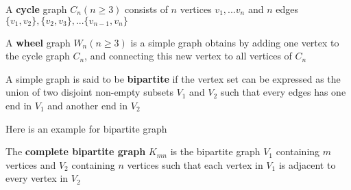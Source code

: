                 \begin{definition}
                    A \textbf{cycle} graph $C_n (n \ge 3)$ consists of $n$ vertices $v_1, ... v_n$ and $n$ edges $\{v_1, v_2\}, \{v_2, v_3\}, ... \{v_{n-1}, v_n\}$
                \end{definition}

                \begin{definition}
                    A \textbf{wheel} graph $W_n (n \ge 3)$ is a simple graph obtains by adding one vertex to the cycle graph $C_n$, and connecting this new vertex to all vertices of $C_n$ 
                \end{definition}

                \begin{definition}
                    A simple graph is said to be \textbf{bipartite} if the vertex set can be expressed as the union of two disjoint non-empty subsets $V_1$ and $V_2$ such that every edges has one end in $V_1$ and another end in $V_2$
                \end{definition}

                \begin{example}
                    Here is an example for bipartite graph
                    \begin{figure}[H]
                        \centering
                    \end{figure}
                \end{example}

                \begin{definition}
                    The \textbf{complete bipartite graph} $K_{mn}$ is the bipartite graph $V_1$ containing $m$ vertices and $V_2$ containing $n$ vertices such that each vertex in $V_1$ is adjacent to every vertex in $V_2$
                \end{definition}

